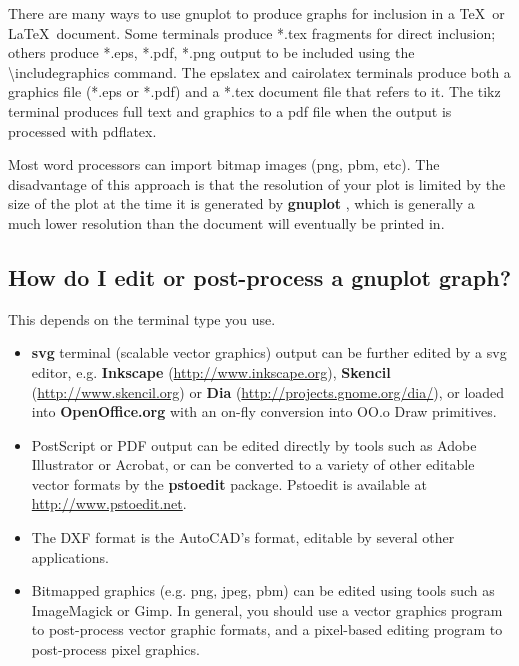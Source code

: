 \documentclass[a4paper,11pt]{article}
\def\http#1{{\small\href{http://#1}{\url{http://#1}}}}
\newcommand{\http}[1]%
            {\htmladdnormallink{\latex{\url{http://#1}}%
                    \html{\textit{http://#1}}}%
                {http://#1}%
            }
\newcommand{\gnuplot}{\textbf{gnuplot }}
\begin{document}
There are many ways to use gnuplot to produce graphs for inclusion in a
\TeX\ or \LaTeX\ document.  
Some terminals produce *.tex fragments for direct inclusion; others 
produce *.eps, *.pdf, *.png output to be included using the
\textbackslash{}includegraphics command.
The epslatex and cairolatex terminals produce both a graphics
file (*.eps or *.pdf) and a *.tex document file that refers to it.
The tikz terminal produces full text and graphics to a pdf file
when the output is processed with pdflatex.

Most word processors can import bitmap images (png, pbm, etc).
The disadvantage of this approach is that the resolution of your
plot is limited by the size of the plot at the time it is generated
by \gnuplot, which is generally a much lower resolution than the
document will eventually be printed in.


\subsection{How do I edit or post-process a \gnuplot graph?}

This depends on the terminal type you use.

\begin{itemize}

\item \textbf{svg} terminal (scalable vector graphics) output can
be further edited by a svg editor, e.g. 
\textbf{Inkscape} (\http{www.inkscape.org}),
\textbf{Skencil} (\http{www.skencil.org}) or
\textbf{Dia} (\http{projects.gnome.org/dia/}), or loaded
into \textbf{OpenOffice.org} with an on-fly conversion into OO.o Draw
primitives.

\item PostScript or PDF output can be edited directly by tools such
as Adobe Illustrator or Acrobat, or can be converted to a variety
of other editable vector formats by the \textbf{pstoedit} package.
Pstoedit is available at \http{www.pstoedit.net}.

\item The DXF format is the AutoCAD's format, editable by several
other applications.

\item Bitmapped graphics (e.g. png, jpeg, pbm) can be edited using
tools such as ImageMagick or Gimp.  
In general, you should use a vector graphics program to post-process
vector graphic formats, and a pixel-based editing program 
to post-process pixel graphics.

\end{itemize}
\end{document}
